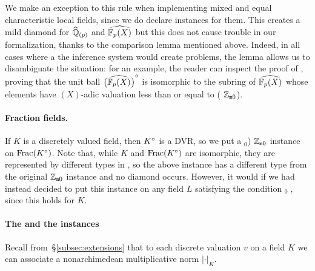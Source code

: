 \documentclass[sigplan,screen]{acmart}
\begin{document}
We make an exception to this rule when implementing mixed and equal characteristic local fields, since we do declare  instances for them. This creates a mild diamond for $\widehat{\mathbb{Q}}_{(p)}$ and $\FpXCompl$ but this does not cause trouble in our formalization, thanks to the comparison lemma \href{https://github.com/mariainesdff/local_fields_journal/blob/0b408ff3af36e18f991f9d4cb87be3603cfc3fc3/src/discrete_valuation_ring/trivial_extension.lean#L63}{\extlink} mentioned above. Indeed, in all cases where a the inference system would create problems, the lemma allows us to disambiguate the situation: for an example, the reader can inspect the proof of \href{https://github.com/mariainesdff/local_fields_journal/blob/0b408ff3af36e18f991f9d4cb87be3603cfc3fc3/src/eq_characteristic/valuation.lean#L102}{\extlink}, proving that the unit ball $\FpXComplInt$ is isomorphic to the subring of $\FpXCompl$ whose elements have $(X)$-adic valuation less than or equal to ( $\mathbb{Z}_{\mathtt{m}0}$).

\paragraph{Fraction fields.}
If $K$ is a discretely valued field, then ${K}^\circ$ is a DVR, so we put a \code{[valued (fraction_ring K}$_0$) $\mathbb{Z}_{\mathtt{m}0}$\code{]} instance on $\operatorname{Frac}({K}^\circ)$\href{https://github.com/mariainesdff/local_fields_journal/blob/0b408ff3af36e18f991f9d4cb87be3603cfc3fc3/src/discrete_valuation_ring/basic.lean#L458}{\extlink}. Note that, while $K$ and $\operatorname{Frac}({K}^\circ)$ are isomorphic, they are represented by different types in \mathlib, so the above  instance has a different type from the original \code{[valued K} $\mathbb{Z}_{\mathtt{m}0}$\code{]} instance and no diamond occurs. However, it would if we had instead decided to put this  instance on any field $L$ satisfying the condition \code{[is_fraction_ring K}$_0\; $\code{L]}, since this holds for $K$.

\paragraph{The  and the  instances}
Recall from~\S\ref{subsec:extensions} that to each discrete valuation $v$ on a field $K$ we can associate a nonarchimedean multiplicative norm $\lvert\cdot\rvert_K$.
\end{document}
